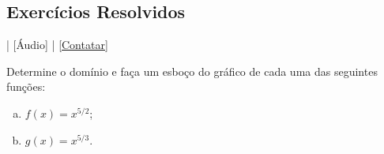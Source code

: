 \subsection*{Exercícios Resolvidos}

\begin{flushright}
  [Vídeo] | [Áudio] | \href{https://phkonzen.github.io/notas/contato.html}{[Contatar]}
\end{flushright}

\begin{exeresol}\label{exeresol:funpot_graf}
  Determine o domínio e faça um esboço do gráfico de cada uma das seguintes funções:
  \begin{enumerate}[a)]
  \item $\displaystyle f(x) = x^{5/2}$;
  \item $\displaystyle g(x) = x^{5/3}$.
  \end{enumerate}
\end{exeresol}
